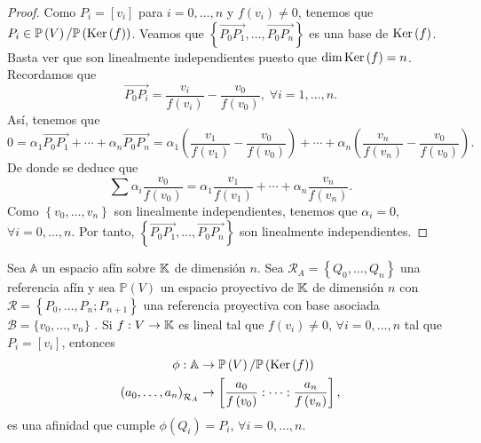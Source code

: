 \begin{proof}
	Como $\displaystyle P_{i} = [v_{i}] $ para $\displaystyle i = 0, \ldots,n $ y $\displaystyle f\left(v_{i}\right) \neq 0 $, tenemos que $\displaystyle P_{i} \in \mathbb{P}\left(V\right) / \mathbb{P}\left(\operatorname{Ker}\left(f\right)\right) $. Veamos que $\displaystyle \left\{ \overrightarrow{P_{0}P_{1}}, \ldots, \overrightarrow{P_{0} P_{n}}\right\}  $ es una base de $\displaystyle \operatorname{Ker}\left(f\right) $. 
	Basta ver que son linealmente independientes puesto que $\displaystyle \dim \operatorname{Ker}\left(f\right) = n $. Recordamos que
	\[\overrightarrow{P_{0}P_{i}} = \frac{v_{i}}{f\left(v_{i}\right)} - \frac{v_{0}}{f\left(v_{0}\right)}, \; \forall i = 1, \ldots, n .\]
	Así, tenemos que 
	\[0 = \alpha_{1}\overrightarrow{P_{0}P_{1}} + \cdots + \alpha_{n}\overrightarrow{P_{0}P_{n}} = \alpha_{1}\left(\frac{v_{1}}{f\left(v_{1}\right)}-\frac{v_{0}}{f\left(v_{0}\right)}\right) + \cdots + \alpha_{n}\left(\frac{v_{n}}{f\left(v_{n}\right)}-\frac{v_{0}}{f\left(v_{0}\right)}\right) .\]
	De donde se deduce que
	\[\sum\alpha_{i}\frac{v_{0}}{f\left(v_{0}\right)} = \alpha_{1}\frac{v_{1}}{f\left(v_{1}\right)}+ \cdots + \alpha_{n}\frac{v_{n}}{f\left(v_{n}\right)} .\]
	Como $\displaystyle \left\{ v_{0}, \ldots, v_{n}\right\}  $ son linealmente independientes, tenemos que $\displaystyle \alpha_{i} = 0 $, $\displaystyle \forall i = 0, \ldots, n $. Por tanto, $\displaystyle \left\{ \overrightarrow{P_{0}P_{1}}, \ldots, \overrightarrow{P_{0}P_{n}}\right\}  $ son linealmente independientes.
\end{proof}
\begin{prop}
Sea $\displaystyle \mathbb{A} $ un espacio afín sobre $\displaystyle \mathbb{K} $ de dimensión $\displaystyle n $. Sea $\displaystyle \mathcal{R}_{A} = \left\{ Q_{0}, \ldots, Q_{n}\right\}  $ una referencia afín y sea $\displaystyle \mathbb{P}\left(V\right) $ un espacio proyectivo de $\displaystyle \mathbb{K} $ de dimensión $\displaystyle n $ con $\displaystyle \mathcal{R} = \left\{ P_{0}, \ldots, P_{n}; P_{n+1}\right\}  $ una referencia proyectiva con base asociada $\displaystyle \mathcal{B} = \{v_{0}, \ldots, v_{n}\} $ . Si $\displaystyle f : V \to \mathbb{K} $ es lineal tal que $\displaystyle f\left(v_{i}\right) \neq 0 $, $\displaystyle \forall i = 0, \ldots, n $ tal que $\displaystyle P_{i} = [v_{i}] $, entonces 
	\[
	\begin{split}
		\phi : \mathbb{A} & \to \mathbb{P}\left(V\right) / \mathbb{P}\left(\operatorname{Ker}\left(f\right)\right) \\ 
		\left(a_{0}, \ldots, a_{n}\right)_{\mathcal{R}_{A}} & \to \left[\frac{a_{0}}{f\left(v_{0}\right)} : \cdots : \frac{a_{n}}{f\left(v_{n}\right)}\right] ,
	\end{split}
	\]
	es una afinidad que cumple $\displaystyle \phi\left(Q_{i}\right) = P_{i} $, $\displaystyle \forall i = 0, \ldots, n $.
\end{prop}
